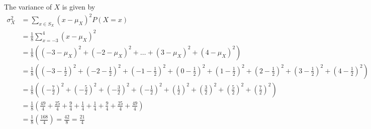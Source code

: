 \documentclass[answers]{exam}
\begin{document}
\begin{questions}
\begin{parts}
\begin{solution}
            The variance of $X$ is given by
            \begin{align*}
                \sigma_X^2 & = \sum_{x \in S_X} (x - \mu_X)^2 P(X = x)                                                                                                                                                                   \\
                           & = \frac{1}{8} \sum_{x = -3}^4 (x - \mu_X)^2                                                                                                                                                                 \\
                           & = \frac{1}{8} \left((-3 - \mu_X)^2 + (-2 - \mu_X)^2 + \dots + (3 - \mu_X)^2 + (4 - \mu_X)^2\right)                                                                                                          \\
                           & = \frac{1}{8} \left((-3 - \frac{1}{2})^2 + (-2 - \frac{1}{2})^2 + (-1 - \frac{1}{2})^2 + (0 - \frac{1}{2})^2 + (1 - \frac{1}{2})^2 + (2 - \frac{1}{2})^2 + (3 - \frac{1}{2})^2 + (4 - \frac{1}{2})^2\right) \\
                           & = \frac{1}{8} \left((-\frac{7}{2})^2 + (-\frac{5}{2})^2 + (-\frac{3}{2})^2 + (-\frac{1}{2})^2 + (\frac{1}{2})^2 + (\frac{3}{2})^2 + (\frac{5}{2})^2 + (\frac{7}{2})^2\right)                                \\
                           & = \frac{1}{8} \left(\frac{49}{4} + \frac{25}{4} + \frac{9}{4} + \frac{1}{4} + \frac{1}{4} + \frac{9}{4} + \frac{25}{4} + \frac{49}{4}\right)                                                                \\
                           & = \frac{1}{8} \left(\frac{168}{4}\right) = \frac{42}{8} = \frac{21}{4}                                                                                                                                      \\
            \end{align*}

        \end{solution}

\end{parts}
\end{questions}
\end{document}
